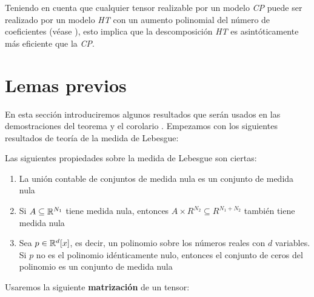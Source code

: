 Teniendo en cuenta que cualquier tensor realizable por un modelo \textit{CP} puede ser realizado por un modelo \textit{HT} con un aumento polinomial del número de coeficientes (véase ), esto implica que la descomposición \textit{HT} es asintóticamente más eficiente que la \textit{CP}.

\section{Lemas previos} \label{sec:lemas_previos}

En esta sección introduciremos algunos resultados que serán usados en las demostraciones del teorema  y el corolario . Empezamos con los siguientes resultados de teoría de la medida de Lebesgue:

\begin{lema} \label{lema:prop_fundamentales_medida} Las siguientes propiedades sobre la medida de Lebesgue son ciertas:

\begin{enumerate}
    \item La unión contable de conjuntos de medida nula es un conjunto de medida nula
    \item Si $A \subseteq \mathbb{R}^{N_1}$ tiene medida nula, entonces $A \times R^{N_2} \subseteq R^{N_1 + N_2}$ también tiene medida nula
    \item Sea $p \in \mathbb{R}^d[x]$, es decir, un polinomio sobre los números reales con $d$ variables. Si $p$ no es el polinomio idénticamente nulo, entonces el conjunto de ceros del polinomio es un conjunto de medida nula \cite{informatica:zeros_of_polynomial}
\end{enumerate}

\end{lema}

Usaremos la siguiente \textbf{matrización} de un tensor:

